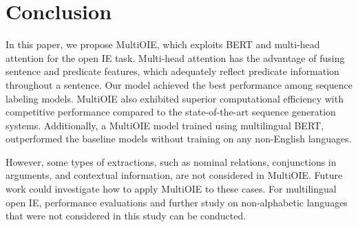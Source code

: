 \documentclass[11pt,a4paper]{article}
\begin{document}
\section{Conclusion}
In this paper, we propose MultiOIE, which exploits BERT and multi-head attention for the open IE task.
Multi-head attention has the advantage of fusing sentence and predicate features, which adequately reflect predicate information throughout a sentence.
Our model achieved the best performance among sequence labeling models.
MultiOIE also exhibited superior computational efficiency with competitive performance compared to the state-of-the-art sequence generation systems.
Additionally, a MultiOIE model trained using multilingual BERT, outperformed the baseline models without training on any non-English languages.

However, some types of extractions, such as nominal relations, conjunctions in arguments, and contextual information, are not considered in MultiOIE.
Future work could investigate how to apply MultiOIE to these cases.
For multilingual open IE, performance evaluations and further study on non-alphabetic languages that were not considered in this study can be conducted.



\end{document}
